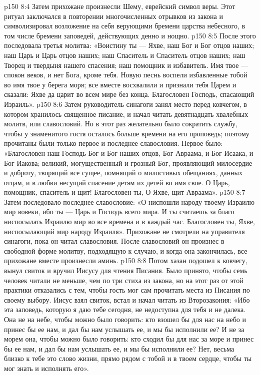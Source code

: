 \vs p150 8:4 Затем прихожане произнесли Шему, еврейский символ веры. Этот ритуал заключался в повторении многочисленных отрывков из закона и символизировал возложение на себя верующими бремени царства небесного, в том числе бремени заповедей, действующих денно и нощно.
\vs p150 8:5 После этого последовала третья молитва: «Воистину ты --- Яхве, наш Бог и Бог отцов наших; наш Царь и Царь отцов наших; наш Спаситель и Спаситель отцов наших; наш Творец и твердыня нашего спасения; наш помощник и избавитель. Имя твое --- спокон веков, и нет Бога, кроме тебя. Новую песнь воспели избавленные тобой во имя твое у берега моря; все вместе восхвалили и признали тебя Царем и сказали: Яхве да царит во всем мире без конца. Благословен Господь, спасающий Израиль».
\vs p150 8:6 Затем руководитель синагоги занял место перед ковчегом, в котором хранилось священное писание, и начал читать девятнадцать хвалебных молитв, или славословий. Но в этот раз желательно было сократить службу, чтобы у знаменитого гостя осталось больше времени на его проповедь; поэтому прочитаны были только первое и последнее славословия. Первое было: «Благословен наш Господь Бог и Бог наших отцов, Бог Авраама, и Бог Исаака, и Бог Иакова; великий, могущественный и грозный Бог, проявляющий милосердие и доброту, творящий все сущее, помнящий о милостивых обещаниях, данных отцам, и в любви несущий спасение детям их детей во имя свое. О Царь, помощник, спаситель и щит! Благословен ты, О Яхве, щит Авраама».
\vs p150 8:7 Затем последовало последнее славословие: «О ниспошли народу твоему Израилю мир вовеки, ибо ты --- Царь и Господь всего мира. И ты считаешь за благо ниспосылать Израилю мир во все времена и в каждый час. Благословен ты, Яхве, ниспосылающий мир народу Израиля». Прихожане не смотрели на управителя синагоги, пока он читал славословия. После славословий он произнес в свободной форме молитву, подходящую к случаю, и когда она закончилась, все прихожане вместе произнесли аминь.
\vs p150 8:8 Потом хазан подошел к ковчегу, вынул свиток и вручил Иисусу для чтения Писания. Было принято, чтобы семь человек читали не меньше, чем по три стиха из закона, но на этот раз от этой практики отказались с тем, чтобы гость мог сам прочитать места из Писания по своему выбору. Иисус взял свиток, встал и начал читать из Второзакония: «Ибо эта заповедь, которую я даю тебе сегодня, не недоступна для тебя и не далека. Она не на небе, чтобы можно было говорить: кто взошел бы для нас на небо и принес бы ее нам, и дал бы нам услышать ее, и мы бы исполнили ее? И не за морем она, чтобы можно было говорить: кто сходил бы для нас за море и принес бы ее нам, и дал бы нам услышать ее, и мы бы исполнили ее? Нет, весьма близко к тебе это слово жизни, прямо рядом с тобой и в твоем сердце, чтобы ты мог знать и исполнять его».
